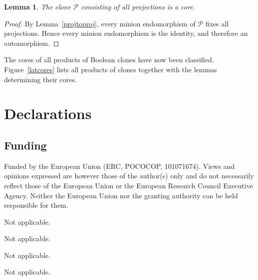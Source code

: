 \documentclass{amsart}
\numberwithin{equation}{section}
\theoremstyle{plain}
\newtheorem{lemma}[theorem]{Lemma}
\theoremstyle{definition}
\def\clone#1{\mathcal{#1}}
\begin{document}
\begin{lemma}\label{proj} The clone $\clone{P}$ consisting of all projections is a core.
\end{lemma}
\begin{proof}
By Lemma~\ref{projtoproj}, every minion endomorphism of $\clone{P}$ fixes all projections. Hence every minion endomorphism is the identity, and therefore an automorphism.
\end{proof}


The cores of all products of Boolean clones have now been classified. Figure~\ref{latcores} lists all products of clones together with the lemmas determining their cores.

\begin{figure}
\end{figure}

\ifau
\section*{Declarations}

\subsection*{Funding}

Funded by the European Union (ERC, POCOCOP, 101071674). Views and opinions expressed are however those of the author(s) only and do not necessarily reflect those of the European Union or the European Research Council Executive Agency. Neither the European Union nor the granting authority can be held responsible for them.

 Not applicable.
\smallskip

 Not applicable. 
\smallskip

 Not applicable. 
\smallskip

 Not applicable. 

\fi
 
 
\end{document}
